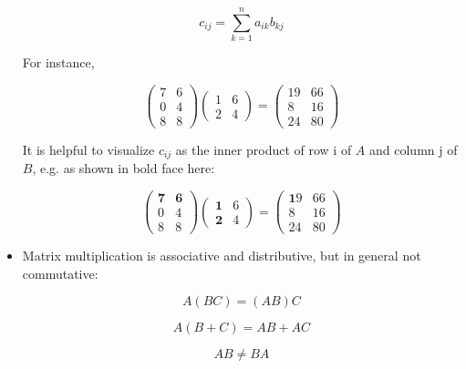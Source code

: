 \begin{itemize}
\begin{equation}
c_{ij} = \sum_{k=1}^n a_{ik} b_{kj}
\end{equation}

For instance,

\begin{equation}
\left (
\begin{array}{cc}
7 & 6 \\
0 & 4 \\
8 & 8 
\end{array}
\right )
\left (
\begin{array}{cc}
1 & 6 \\
2 & 4 
\end{array}
\right ) =
\left (
\begin{array}{cc}
19 & 66 \\
8 & 16 \\
24 & 80
\end{array}
\right ) 
\end{equation}

It is helpful to visualize $c_{ij}$ as the inner product of row i of $A$
and column j of $B$, e.g. as shown in bold face here:

\begin{equation}
\left (
\begin{array}{cc}
\mathbf 7 & \mathbf 6 \\
0 & 4 \\
8 & 8 
\end{array}
\right )
\left (
\begin{array}{cc}
\mathbf 1 & 6 \\
\mathbf 2 & 4 
\end{array}
\right ) =
\left (
\begin{array}{cc}
\mathbf 19 & 66 \\
8 & 16 \\
24 & 80
\end{array}
\right ) 
\end{equation}

\item Matrix multiplication is associative and distributive, but in
general not commutative:

\begin{equation}
A(BC) = (AB)C
\end{equation}

\begin{equation}
A(B+C) = AB + AC
\end{equation}

\begin{equation}
AB \neq BA
\end{equation}

\end{itemize}

